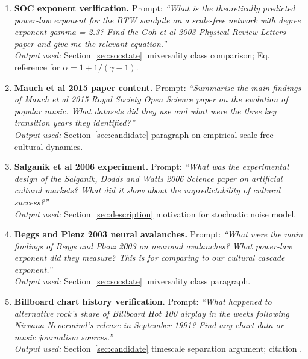 \documentclass[12pt, a4paper]{article}
\begin{document}
\begin{enumerate}[label=\textbf{P\arabic*.}, leftmargin=*, itemsep=6pt]

  \item \textbf{SOC exponent verification.}
  Prompt: \textit{``What is the theoretically predicted
  power-law exponent for the BTW sandpile on a scale-free
  network with degree exponent gamma = 2.3?
  Find the Goh et al 2003 Physical Review Letters paper
  and give me the relevant equation.''}\\
  \textit{Output used:} Section~\ref{sec:socstate}
  universality class comparison; Eq. reference for
  $\alpha=1+1/(\gamma-1)$.

  \item \textbf{Mauch et al 2015 paper content.}
  Prompt: \textit{``Summarise the main findings of
  Mauch et al 2015 Royal Society Open Science paper on
  the evolution of popular music. What datasets did they
  use and what were the three key transition years they
  identified?''}\\
  \textit{Output used:} Section~\ref{sec:candidate}
  paragraph on empirical scale-free cultural dynamics.

  \item \textbf{Salganik et al 2006 experiment.}
  Prompt: \textit{``What was the experimental design of
  the Salganik, Dodds and Watts 2006 Science paper on
  artificial cultural markets? What did it show about
  the unpredictability of cultural success?''}\\
  \textit{Output used:} Section~\ref{sec:description}
  motivation for stochastic noise model.

  \item \textbf{Beggs and Plenz 2003 neural avalanches.}
  Prompt: \textit{``What were the main findings of Beggs
  and Plenz 2003 on neuronal avalanches? What power-law
  exponent did they measure? This is for comparing to our
  cultural cascade exponent.''}\\
  \textit{Output used:} Section~\ref{sec:socstate}
  universality class paragraph.

  \item \textbf{Billboard chart history verification.}
  Prompt: \textit{``What happened to alternative rock's
  share of Billboard Hot 100 airplay in the weeks following
  Nirvana Nevermind's release in September 1991?
  Find any chart data or music journalism sources.''}\\
  \textit{Output used:} Section~\ref{sec:candidate}
  timescale separation argument; citation
  \citet{billboardarchive}.

\end{enumerate}
\end{document}
